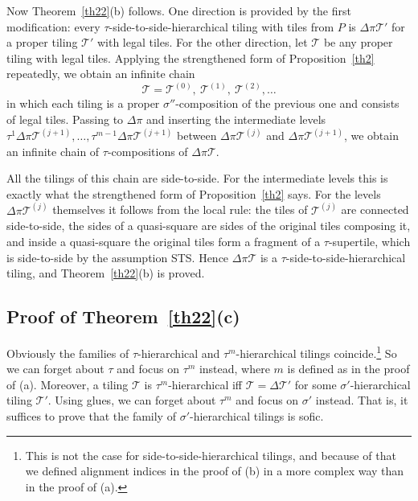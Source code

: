 \documentclass[12pt]{article}
\theoremstyle{remark}
\begin{document}
Now Theorem~\ref{th22}(b) follows. One direction is provided by the first modification: every
$\tau$-side-to-side-hierarchical tiling with tiles from $P$ is $\Delta\pi\mathcal T'$ for a proper
tiling $\mathcal T'$ with legal tiles. For the other direction, let $\mathcal T$ be any proper
tiling with legal tiles. Applying the strengthened form of Proposition~\ref{th2} repeatedly, we
obtain an infinite chain
$$
\mathcal T=\mathcal T^{(0)},\ \mathcal T^{(1)},\ \mathcal T^{(2)},\dots
$$
in which each tiling is a proper $\sigma''$-composition of the previous one and consists of legal
tiles. Passing to $\Delta\pi$ and inserting the intermediate levels
$\tau^1\Delta\pi\mathcal T^{(j+1)},\dots,\tau^{m-1}\Delta\pi\mathcal T^{(j+1)}$ between
$\Delta\pi\mathcal T^{(j)}$ and $\Delta\pi\mathcal T^{(j+1)}$, we obtain an infinite chain of
$\tau$-compositions of $\Delta\pi\mathcal T$.

All the tilings of this chain are side-to-side. For the intermediate levels this is exactly what the
strengthened form of Proposition~\ref{th2} says. For the levels $\Delta\pi\mathcal T^{(j)}$
themselves it follows from the local rule: the tiles of $\mathcal T^{(j)}$ are connected
side-to-side, the sides of a quasi-square are sides of the original tiles composing it, and inside a
quasi-square the original tiles form a fragment of a $\tau$-supertile, which is side-to-side by the
assumption STS. Hence $\Delta\pi\mathcal T$ is a $\tau$-side-to-side-hierarchical tiling, and
Theorem~\ref{th22}(b) is proved.

 \subsection{Proof of Theorem~\ref{th22}(c)}
 
 Obviously the families of $\tau$-hierarchical and $\tau^m$-hierarchical tilings coincide.\footnote{This is not the case for
 side-to-side-hierarchical tilings, and because of that we defined alignment indices in the proof of (b) in a more 
 complex way than in the proof of (a).}
So we can forget about $\tau$ and focus on $\tau^m$ instead, where $m$ is defined as in the proof of (a).
Moreover, a tiling $\mathcal T$ is $\tau^m$-hierarchical iff $\mathcal T=\Delta \mathcal T'$ for some $\sigma'$-hierarchical
tiling $\mathcal T'$. Using glues, we can forget about  $\tau^m$ and focus on $\sigma'$ instead.
That is, it suffices to prove that the family of $\sigma'$-hierarchical tilings is sofic.
\end{document}
